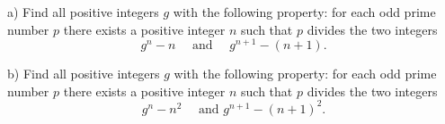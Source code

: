 a) Find all positive integers $g$ with the following property: for each odd prime number $p$ there exists a positive integer $n$ such that $p$ divides the two integers\[g^n - n\quad\text{ and }\quad g^{n+1} - (n + 1).\]

b) Find all positive integers $g$ with the following property: for each odd prime number $p$ there exists a positive integer $n$ such that $p$ divides the two integers\[g^n - n^2\quad\text{ and }g^{n+1} - (n + 1)^2.\]